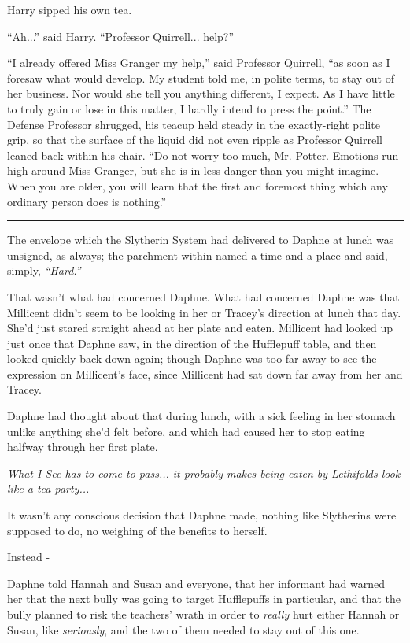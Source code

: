 Harry sipped his own tea.

``Ah...'' said Harry. ``Professor Quirrell... help?''

``I already offered Miss Granger my help,'' said Professor Quirrell, ``as soon as I foresaw what would develop. My student told me, in polite terms, to stay out of her business. Nor would she tell you anything different, I expect. As I have little to truly gain or lose in this matter, I hardly intend to press the point.'' The Defense Professor shrugged, his teacup held steady in the exactly-right polite grip, so that the surface of the liquid did not even ripple as Professor Quirrell leaned back within his chair. ``Do not worry too much, Mr. Potter. Emotions run high around Miss Granger, but she is in less danger than you might imagine. When you are older, you will learn that the first and foremost thing which any ordinary person does is nothing.''

\begin{center}\rule{3in}{0.4pt}\end{center}

The envelope which the Slytherin System had delivered to Daphne at lunch was unsigned, as always; the parchment within named a time and a place and said, simply, \emph{``Hard.''}

That wasn't what had concerned Daphne. What had concerned Daphne was that Millicent didn't seem to be looking in her or Tracey's direction at lunch that day. She'd just stared straight ahead at her plate and eaten. Millicent had looked up just once that Daphne saw, in the direction of the Hufflepuff table, and then looked quickly back down again; though Daphne was too far away to see the expression on Millicent's face, since Millicent had sat down far away from her and Tracey.

Daphne had thought about that during lunch, with a sick feeling in her stomach unlike anything she'd felt before, and which had caused her to stop eating halfway through her first plate.

\emph{What I See has to come to pass... it probably makes being eaten by Lethifolds look like a tea party...}

It wasn't any conscious decision that Daphne made, nothing like Slytherins were supposed to do, no weighing of the benefits to herself.

Instead -

Daphne told Hannah and Susan and everyone, that her informant had warned her that the next bully was going to target Hufflepuffs in particular, and that the bully planned to risk the teachers' wrath in order to \emph{really} hurt either Hannah or Susan, like \emph{seriously}, and the two of them needed to stay out of this one.

